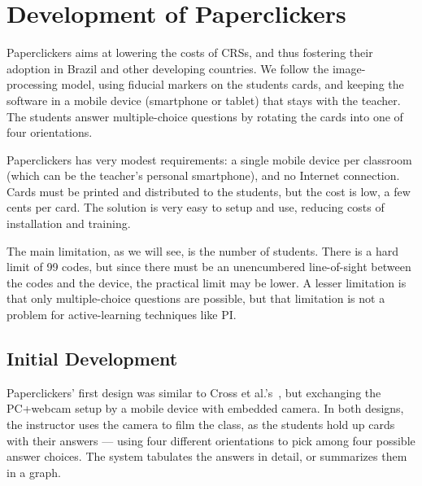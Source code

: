 \section{Development of Paperclickers} \label{sec:proposal}

Paperclickers aims at lowering the costs of CRSs, and thus fostering their adoption in Brazil and other developing countries. We follow the image-processing model, using fiducial markers on the students cards, and keeping the software in a mobile device (smartphone or tablet) that stays with the teacher. The students answer multiple-choice questions by rotating the cards into one of four orientations.

Paperclickers has very modest requirements: a single mobile device per classroom (which can be the teacher's personal smartphone), and no Internet connection. Cards must be printed and distributed to the students, but the cost is low, a few cents per card. The solution is very easy to setup and use, reducing costs of installation and training.

The main limitation, as we will see, is the number of students. There is a hard limit of 99 codes, but since there must be an unencumbered line-of-sight between the codes and the device, the practical limit may be lower. A lesser limitation is that only multiple-choice questions are possible, but that limitation is not a problem for active-learning techniques like PI.





\subsection{Initial Development}

Paperclickers' first design was similar to Cross et al.'s~\cite{cross2012low}, but exchanging the PC+webcam setup by a mobile device with embedded camera. In both designs, the instructor uses the camera to film the class, as the students hold up cards with their answers --- using four different orientations to pick among four possible answer choices. The system tabulates the answers in detail, or summarizes them in a graph.

